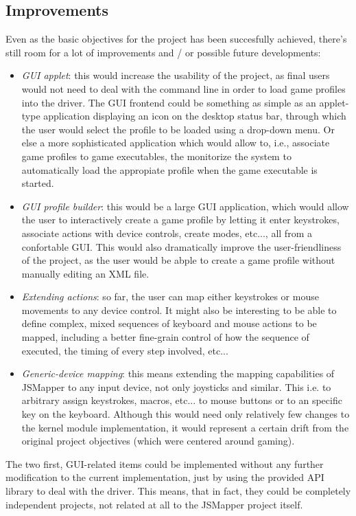 \subsection{Improvements}
Even as the basic objectives for the project has been succesfully achieved, there's still room for a lot of improvements and / or possible future developments:
\begin{itemize}
	\item \emph{GUI applet}: this would increase the usability of the project, as final users would not need to deal with the command line in order to load game profiles into the driver. The GUI frontend could be something as simple as an applet-type application displaying an icon on the desktop status bar, through which the user would select the profile to be loaded using a drop-down menu. Or else a more sophisticated application which would allow to, i.e., associate game profiles to game executables, the monitorize the system to automatically load the appropiate profile when the game executable is started.
	\item \emph{GUI profile builder}: this would be a large GUI application, which would allow the user to interactively create a game profile by letting it enter keystrokes, associate actions with device controls, create modes, etc..., all from a confortable GUI. This would also dramatically improve the user-friendliness of the project, as the user would be abple to create a game profile without manually editing an XML file.
	\item \emph{Extending actions}: so far, the user can map either keystrokes or mouse movements to any device control. It might also be interesting to be able to define complex, mixed sequences of keyboard and mouse actions to be mapped, including a better fine-grain control of how the sequence of executed, the timing of every step involved, etc...
	\item \emph{Generic-device mapping}: this means extending the mapping capabilities of JSMapper to any input device, not only joysticks and similar. This i.e. to arbitrary assign keystrokes, macros, etc... to mouse buttons or to an specific key on the keyboard. Although this would need only relatively few changes to the kernel module implementation, it would represent a certain drift from the original project objectives (which were centered around gaming).
\end{itemize}

The two first, GUI-related items could be implemented without any further modification to the current implementation, just by using the provided API library to deal with the driver. This means, that in fact, they could be completely independent projects, not related at all to the JSMapper project itself.

